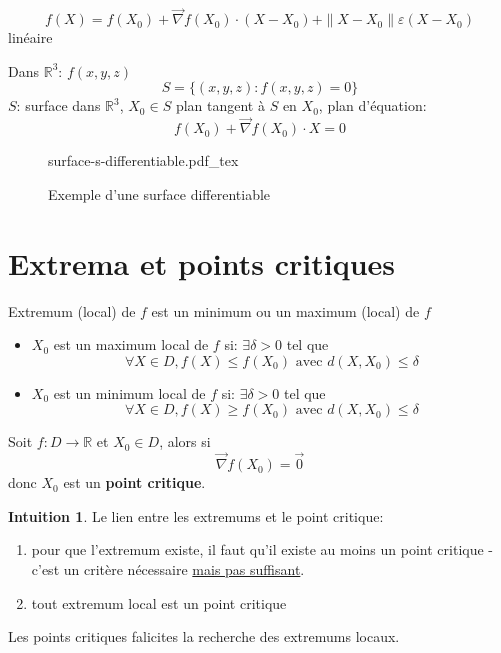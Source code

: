 \documentclass[a4paper]{report}
\newcommand\R{\ensuremath{\mathbb{R}}}
\let\epsilon\varepsilon
\theoremstyle{definition}
\newtheorem*{intuition}{Intuition}
\newcommand{\incfig}[1]{%
    \def\svgwidth{\columnwidth}
    {#1.pdf_tex}
}
\begin{document}
\begin{eg}
   \[
       f(X) = f(X_0) + \vec{\nabla}f(X_0) \cdot (X - X_0) + \|X - X_0\| \epsilon(X - X_0)
   \]  
   linéaire
   \par
   Dans $\R^3$: $f(x, y, z)$
    \[
        S = \{(x, y, z): f(x, y, z) = 0 \}
   \] 
   $S$: surface dans  $\R^3$, $X_0 \in S$ plan tangent à $S$ en  $X_0$, plan d'équation:
   \[
       f(X_0) + \vec{\nabla}f(X_0)\cdot X = 0
   \] 
\begin{figure}[H]
    \centering
    \incfig{surface-s-differentiable}
    \caption{Exemple d'une surface differentiable}
    \label{fig:surface-s-differentiable}
\end{figure}
\end{eg}
\section{Extrema et points critiques}
\begin{definition}
    Extremum (local) de $f$ est un minimum ou un maximum (local) de  $f$
    \begin{itemize}
        \item $X_0$ est un maximum local de $f$ si: $\exists \delta > 0$ tel que
            \[
            \forall X \in D, f(X) \le f(X_0) \text{ avec } d(X, X_0) \le \delta
            \] 
        \item $X_0$ est un minimum local de $f$ si: $\exists \delta > 0$ tel que
            \[
            \forall X \in D, f(X) \ge f(X_0) \text{ avec } d(X, X_0) \le \delta
            \] 
    \end{itemize}
\end{definition}

\begin{definition}
    Soit $f: D \to \R$ et $X_0 \in D$, alors si
     \[
         \vec{\nabla}f(X_0) = \vec{0}
    \] 
    donc $X_0$ est un \textbf{point critique}.
\end{definition}
\begin{intuition}
   Le lien entre les extremums et le point critique: 
   \begin{enumerate}
       \item pour que l'extremum existe, il faut qu'il existe au moins un point critique - c'est un critère nécessaire \underline{mais pas suffisant}.
       \item tout extremum local est un point critique
   \end{enumerate}
   Les points critiques falicites la recherche des extremums locaux.
\end{intuition}
\end{document}
